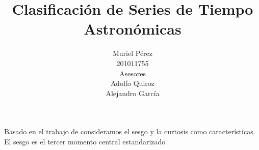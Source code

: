 \message{ !name(documento.tex)}\documentclass[letterpaper,12pt]{book}
\title{Clasificación de Series de Tiempo Astronómicas}
\author{Muriel Pérez\\ 201011755 \\
  Asesores\\
Adolfo Quiroz \\
Alejandro García}
\begin{document}



Basado en el trabajo de \cite{rodriguez_feliciano_alisis_2012} consideramos el sesgo y la curtosis como características. El sesgo es el tercer momento central estandarizado 
\end{document}
